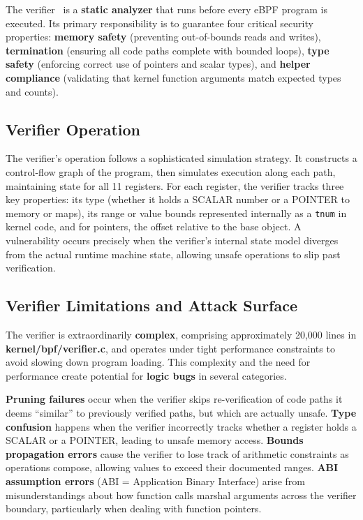 The verifier~\cite{bpf-verifier} is a \textbf{static analyzer} that runs before every eBPF program is executed. Its primary responsibility is to guarantee four critical security properties: \textbf{memory safety} (preventing out-of-bounds reads and writes), \textbf{termination} (ensuring all code paths complete with bounded loops), \textbf{type safety} (enforcing correct use of pointers and scalar types), and \textbf{helper compliance} (validating that kernel function arguments match expected types and counts).

\subsection{Verifier Operation}

The verifier's operation follows a sophisticated simulation strategy. It constructs a control-flow graph of the program, then simulates execution along each path, maintaining state for all 11 registers. For each register, the verifier tracks three key properties: its type (whether it holds a SCALAR number or a POINTER to memory or maps), its range or value bounds represented internally as a \texttt{tnum} in kernel code, and for pointers, the offset relative to the base object. A vulnerability occurs precisely when the verifier's internal state model diverges from the actual runtime machine state, allowing unsafe operations to slip past verification.

\subsection{Verifier Limitations and Attack Surface}

The verifier is extraordinarily \textbf{complex}, comprising approximately 20,000 lines in \textbf{kernel/bpf/verifier.c}, and operates under tight performance constraints to avoid slowing down program loading. This complexity and the need for performance create potential for \textbf{logic bugs} in several categories.

\noindent
\textbf{Pruning failures} occur when the verifier skips re-verification of code paths it deems ``similar'' to previously verified paths, but which are actually unsafe. \textbf{Type confusion} happens when the verifier incorrectly tracks whether a register holds a SCALAR or a POINTER, leading to unsafe memory access. \textbf{Bounds propagation errors} cause the verifier to lose track of arithmetic constraints as operations compose, allowing values to exceed their documented ranges. \textbf{ABI assumption errors} (ABI = Application Binary Interface) arise from misunderstandings about how function calls marshal arguments across the verifier boundary, particularly when dealing with function pointers.

